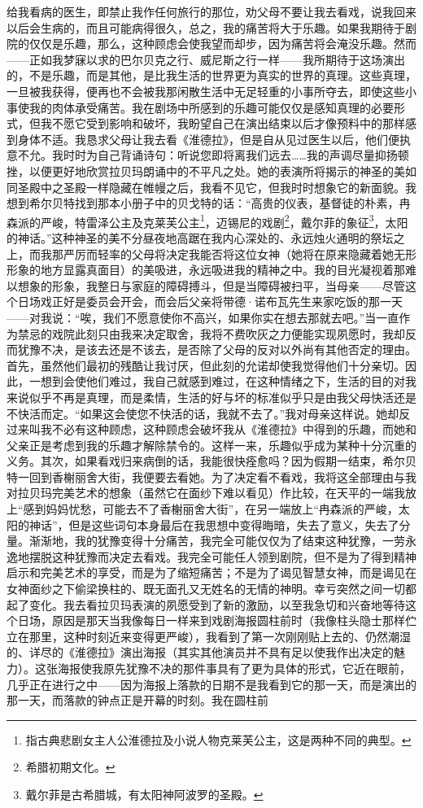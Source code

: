 \par 给我看病的医生，即禁止我作任何旅行的那位，劝父母不要让我去看戏，说我回来以后会生病的，而且可能病得很久，总之，我的痛苦将大于乐趣。如果我期待于剧院的仅仅是乐趣，那么，这种顾虑会使我望而却步，因为痛苦将会淹没乐趣。然而——正如我梦寐以求的巴尔贝克之行、威尼斯之行一样——我所期待于这场演出的，不是乐趣，而是其他，是比我生活的世界更为真实的世界的真理。这些真理，一旦被我获得，便再也不会被我那闲散生活中无足轻重的小事所夺去，即使这些小事使我的肉体承受痛苦。我在剧场中所感到的乐趣可能仅仅是感知真理的必要形式，但我不愿它受到影响和破坏，我盼望自己在演出结束以后才像预料中的那样感到身体不适。我恳求父母让我去看《淮德拉》，但是自从见过医生以后，他们便执意不允。我时时为自己背诵诗句：听说您即将离我们远去……我的声调尽量抑扬顿挫，以便更好地欣赏拉贝玛朗诵中的不平凡之处。她的表演所将揭示的神圣的美如同圣殿中之圣殿一样隐藏在帷幔之后，我看不见它，但我时时想象它的新面貌。我想到希尔贝特找到那本小册子中的贝戈特的话：“高贵的仪表，基督徒的朴素，冉森派的严峻，特雷泽公主及克莱芙公主\footnote{指古典悲剧女主人公淮德拉及小说人物克莱芙公主，这是两种不同的典型。}，迈锡尼的戏剧\footnote{希腊初期文化。}，戴尔菲的象征\footnote{戴尔菲是古希腊城，有太阳神阿波罗的圣殿。}，太阳的神话。”这种神圣的美不分昼夜地高踞在我内心深处的、永远烛火通明的祭坛之上，而我那严厉而轻率的父母将决定我能否将这位女神（她将在原来隐藏着她无形形象的地方显露真面目）的美吸进，永远吸进我的精神之中。我的目光凝视着那难以想象的形象，我整日与家庭的障碍搏斗，但是当障碍被扫平，当母亲——尽管这个日场戏正好是委员会开会，而会后父亲将带德·诺布瓦先生来家吃饭的那一天——对我说：“唉，我们不愿意使你不高兴，如果你实在想去那就去吧。”当一直作为禁忌的戏院此刻只由我来决定取舍，我将不费吹灰之力便能实现夙愿时，我却反而犹豫不决，是该去还是不该去，是否除了父母的反对以外尚有其他否定的理由。首先，虽然他们最初的残酷让我讨厌，但此刻的允诺却使我觉得他们十分亲切。因此，一想到会使他们难过，我自己就感到难过，在这种情绪之下，生活的目的对我来说似乎不再是真理，而是柔情，生活的好与坏的标准似乎只是由我父母快活还是不快活而定。“如果这会使您不快活的话，我就不去了。”我对母亲这样说。她却反过来叫我不必有这种顾虑，这种顾虑会破坏我从《淮德拉》中得到的乐趣，而她和父亲正是考虑到我的乐趣才解除禁令的。这样一来，乐趣似乎成为某种十分沉重的义务。其次，如果看戏归来病倒的话，我能很快痊愈吗？因为假期一结束，希尔贝特一回到香榭丽舍大街，我便要去看她。为了决定看不看戏，我将这全部理由与我对拉贝玛完美艺术的想象（虽然它在面纱下难以看见）作比较，在天平的一端我放上“感到妈妈忧愁，可能去不了香榭丽舍大街”，在另一端放上“冉森派的严峻，太阳的神话”，但是这些词句本身最后在我思想中变得晦暗，失去了意义，失去了分量。渐渐地，我的犹豫变得十分痛苦，我完全可能仅仅为了结束这种犹豫，一劳永逸地摆脱这种犹豫而决定去看戏。我完全可能任人领到剧院，但不是为了得到精神启示和完美艺术的享受，而是为了缩短痛苦；不是为了谒见智慧女神，而是谒见在女神面纱之下偷梁换柱的、既无面孔又无姓名的无情的神明。幸亏突然之间一切都起了变化。我去看拉贝玛表演的夙愿受到了新的激励，以至我急切和兴奋地等待这个日场，原因是那天当我像每日一样来到戏剧海报圆柱前时（我像柱头隐士那样伫立在那里，这种时刻近来变得更严峻），我看到了第一次刚刚贴上去的、仍然潮湿的、详尽的《淮德拉》演出海报（其实其他演员并不具有足以使我作出决定的魅力）。这张海报使我原先犹豫不决的那件事具有了更为具体的形式，它近在眼前，几乎正在进行之中——因为海报上落款的日期不是我看到它的那一天，而是演出的那一天，而落款的钟点正是开幕的时刻。我在圆柱前